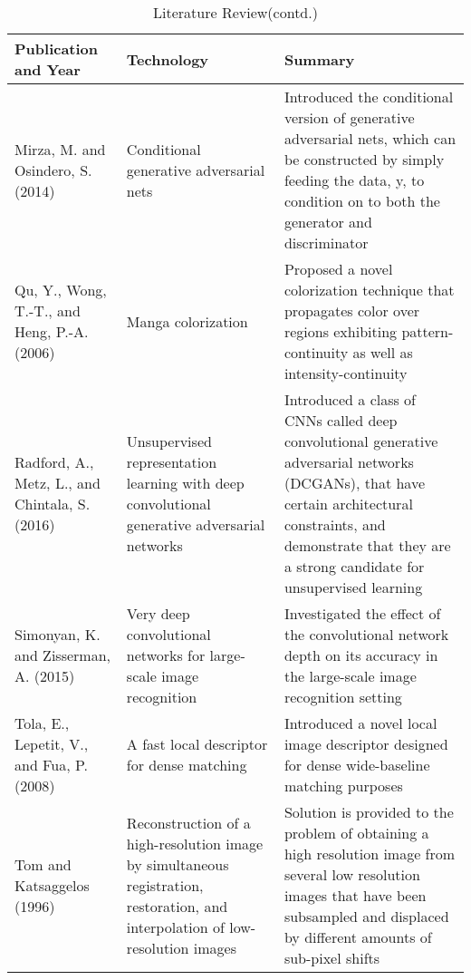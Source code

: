\begin{table}[!htbp]
\begin{center}
\def\arraystretch{1.5}
  \begin{tabularx}{\textwidth}{| X | X | X | } \hline
Publication and Year & Technology & Summary \\ \hline

Mirza, M. and Osindero, S. (2014) &  Conditional generative adversarial nets & Introduced the conditional version of generative adversarial nets, which can be constructed by simply feeding the data, y, to condition on to both the generator and discriminator\\ \hline

Qu, Y., Wong, T.-T., and Heng, P.-A. (2006) &  Manga colorization & Proposed a novel colorization technique that propagates color over regions exhibiting pattern-continuity as well as intensity-continuity\\ \hline

Radford, A., Metz, L., and Chintala, S. (2016) &  Unsupervised representation learning with deep convolutional generative adversarial networks & Introduced a class of CNNs called deep convolutional generative adversarial networks (DCGANs), that have certain architectural constraints, and demonstrate that they are a strong candidate for unsupervised learning\\ \hline

Simonyan, K. and Zisserman, A. (2015) & Very deep convolutional networks for large-scale image recognition & Investigated the effect of the convolutional network depth on its accuracy in the large-scale image recognition setting\\ \hline

Tola, E., Lepetit, V., and Fua, P. (2008) & A fast local descriptor for dense matching & Introduced a novel local image descriptor designed for dense wide-baseline matching purposes \\ \hline

Tom and Katsaggelos (1996) & Reconstruction of a high-resolution image by simultaneous registration, restoration, and interpolation of low-resolution images & Solution is provided to the problem of obtaining a high resolution image from several low resolution images that have been subsampled and displaced by different amounts of sub-pixel shifts \\ \hline

\end{tabularx}
\caption{Literature Review(contd.)}
 \label{tab:hreq}
\end{center}
\end{table}
